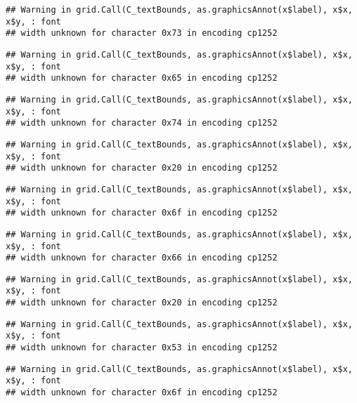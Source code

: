 \documentclass[
]{article}
\begin{document}
\begin{verbatim}
## Warning in grid.Call(C_textBounds, as.graphicsAnnot(x$label), x$x, x$y, : font
## width unknown for character 0x73 in encoding cp1252
\end{verbatim}

\begin{verbatim}
## Warning in grid.Call(C_textBounds, as.graphicsAnnot(x$label), x$x, x$y, : font
## width unknown for character 0x65 in encoding cp1252
\end{verbatim}

\begin{verbatim}
## Warning in grid.Call(C_textBounds, as.graphicsAnnot(x$label), x$x, x$y, : font
## width unknown for character 0x74 in encoding cp1252
\end{verbatim}

\begin{verbatim}
## Warning in grid.Call(C_textBounds, as.graphicsAnnot(x$label), x$x, x$y, : font
## width unknown for character 0x20 in encoding cp1252
\end{verbatim}

\begin{verbatim}
## Warning in grid.Call(C_textBounds, as.graphicsAnnot(x$label), x$x, x$y, : font
## width unknown for character 0x6f in encoding cp1252
\end{verbatim}

\begin{verbatim}
## Warning in grid.Call(C_textBounds, as.graphicsAnnot(x$label), x$x, x$y, : font
## width unknown for character 0x66 in encoding cp1252
\end{verbatim}

\begin{verbatim}
## Warning in grid.Call(C_textBounds, as.graphicsAnnot(x$label), x$x, x$y, : font
## width unknown for character 0x20 in encoding cp1252
\end{verbatim}

\begin{verbatim}
## Warning in grid.Call(C_textBounds, as.graphicsAnnot(x$label), x$x, x$y, : font
## width unknown for character 0x53 in encoding cp1252
\end{verbatim}

\begin{verbatim}
## Warning in grid.Call(C_textBounds, as.graphicsAnnot(x$label), x$x, x$y, : font
## width unknown for character 0x6f in encoding cp1252
\end{verbatim}
\end{document}
